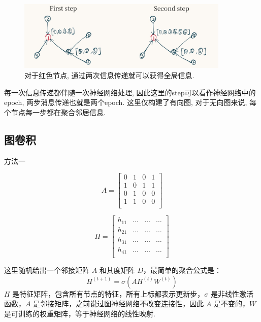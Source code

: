 \documentclass{beamer}
\begin{document}
\begin{frame}
    \begin{figure}
        \includegraphics[width=0.9\textwidth]{两步消息传递.png}
        \caption{对于红色节点, 通过两次信息传递就可以获得全局信息.}
    \end{figure}
    每一次信息传递都伴随一次神经网络处理, 因此这里的step可以看作神经网络中的epoch, 两步消息传递也就是两个epoch. 这里仅构建了有向图, 对于无向图来说, 每个节点每一步都在聚合邻居信息.
\end{frame}

\subsection{图卷积}

\begin{frame}{方法一}
    \small
    \begin{multicols}{2}
        \[
            A =
            \begin{bmatrix}
                0 & 1 & 0 & 1 \\
                1 & 0 & 1 & 1 \\
                0 & 1 & 0 & 0 \\
                1 & 1 & 0 & 0 \\
            \end{bmatrix}
        \]

        \[
            H =
            \begin{bmatrix}
                h_{11} & \ldots & \ldots & \ldots \\
                h_{21} & \ldots & \ldots & \ldots \\
                h_{31} & \ldots & \ldots & \ldots \\
                h_{41} & \ldots & \ldots & \ldots \\
            \end{bmatrix}
        \]
    \end{multicols}

    这里随机给出一个邻接矩阵 \(A\) 和其度矩阵 \(D\)，最简单的聚合公式是：
    \[ H^{(t+1)} = \sigma(AH^{(t)}W^{(t)}) \]
    \(H\) 是特征矩阵，包含所有节点的特征，所有上标都表示更新步，\(\sigma\) 是非线性激活函数，\(A\) 是邻接矩阵，之前说过图神经网络不改变连接性，因此 \(A\) 是不变的，\(W\) 是可训练的权重矩阵，等于神经网络的线性映射.
\end{frame}
\end{document}
